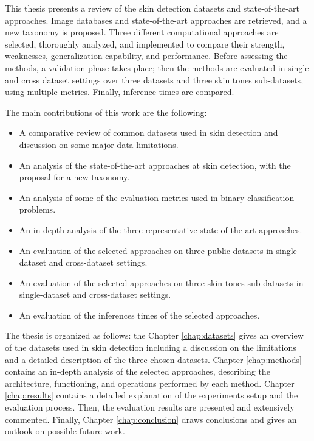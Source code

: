 This thesis presents a review of the skin detection datasets and state-of-the-art approaches.
Image databases and state-of-the-art approaches are retrieved, and a new taxonomy is proposed.
Three different computational approaches are selected, thoroughly analyzed, and implemented to compare their strength, weaknesses, generalization capability, and performance.
Before assessing the methods, a validation phase takes place; then the methods are evaluated in single and cross dataset settings over three datasets and three skin tones sub-datasets, using multiple metrics.
Finally, inference times are compared.

The main contributions of this work are the following:
\begin{itemize}
  \item A comparative review of common datasets used in skin detection and discussion on some major data limitations.
  \item An analysis of the state-of-the-art approaches at skin detection, with the proposal for a new taxonomy.
  \item An analysis of some of the evaluation metrics used in binary classification problems.
  \item An in-depth analysis of the three representative state-of-the-art approaches.
  \item An evaluation of the selected approaches on three public datasets in single-dataset and cross-dataset settings.
  \item An evaluation of the selected approaches on three skin tones sub-datasets in single-dataset and cross-dataset settings.
  \item An evaluation of the inferences times of the selected approaches.
\end{itemize}
The thesis is organized as follows: the Chapter \ref{chap:datasets} gives an overview of the datasets used in skin detection including a discussion on the limitations and a detailed description of the three chosen datasets.
Chapter \ref{chap:methods} contains an in-depth analysis of the selected approaches, describing the architecture, functioning, and operations performed by each method.
Chapter \ref{chap:results} contains a detailed explanation of the experiments setup and the evaluation process.
Then, the evaluation results are presented and extensively commented.
Finally, Chapter \ref{chap:conclusion} draws conclusions and gives an outlook on possible future work.

